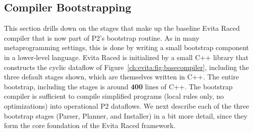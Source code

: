 \subsection{Compiler Bootstrapping}
\label{ch:evita:sec:bootstrap}

This section drills down on the stages that make up the baseline Evita Raced
compiler that is now part of P2's bootstrap routine.  As in many
metaprogramming settings, this is done by writing a small bootstrap component
in a lower-level language.  Evita Raced is initialized by a small C++ library
that constructs the cyclic dataflow of Figure~\ref{ch:evita:fig:basecompiler},
including the three default stages shown, which are themselves written in C++.
The entire bootstrap, including the stages is around {\bf 400} lines of C++.
The bootstrap compiler is sufficient to compile simplified \OVERLOG programs
(local rules only, no optimizations) into operational P2 dataflows.  We next
describe each of the three bootstrap stages (Parser, Planner, and Installer) in
a bit more detail, since they form the core foundation of the Evita Raced
framework.



